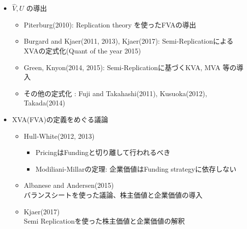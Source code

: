 \documentclass[driverfallback=dvipdfmx,cjk]{beamer}
\begin{document}
\begin{frame}
    \begin{itemize}
        \item $\hat{V}, U$ の導出
        \begin{itemize}
            \item Piterburg(2010):
            Replication theory を使ったFVAの導出
            \item Burgard and Kjaer(2011,  2013), Kjaer(2017):
            Semi-ReplicationによるXVAの定式化(Quant of the year 2015)
            \item Green, Knyon(2014, 2015):
            Semi-Replicationに基づくKVA, MVA 等の導入
            \item その他の定式化 : Fuji and Takahashi(2011), Kusuoka(2012), Takada(2014)
        \end{itemize}
        \item XVA(FVA)の定義をめぐる議論
        \begin{itemize}
            \item Hull-White(2012, 2013)
            \begin{itemize}
                \item PricingはFundingと切り離して行われるべき
                \item Modiliani-Millarの定理: 企業価値はFunding strategyに依存しない 
            \end{itemize}
            
            \item Albanese and Andersen(2015)\\
            バランスシートを使った議論、株主価値と企業価値の導入
            \item Kjaer(2017) \\
            Semi Replicationを使った株主価値と企業価値の解釈
        \end{itemize}
    \end{itemize}
\end{frame}
\end{document}
